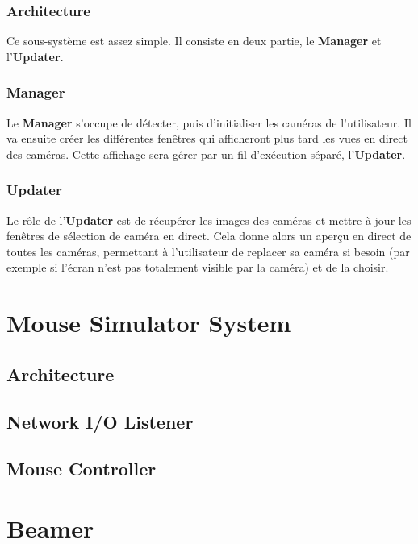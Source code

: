 \documentclass[11pt,a4paper,oldfontcommands]{memoir}
\begin{document}
\subsubsection{Architecture}

Ce sous-système est assez simple. Il consiste en deux partie, le \textbf{Manager} et l'\textbf{Updater}.

\subsubsection{Manager}

Le \textbf{Manager} s'occupe de détecter, puis d'initialiser les caméras de l'utilisateur. Il va ensuite créer les différentes fenêtres qui afficheront plus tard les vues en direct des caméras. Cette affichage sera gérer par un fil d'exécution séparé, l'\textbf{Updater}.

\subsubsection{Updater}

Le rôle de l'\textbf{Updater} est de récupérer les images des caméras et mettre à jour les fenêtres de sélection de caméra en direct. Cela donne alors un aperçu en direct de toutes les caméras, permettant à l'utilisateur de replacer sa caméra si besoin (par exemple si l'écran n'est pas totalement visible par la caméra) et de la choisir.

\newpage

\section{Mouse Simulator System}

\subsection{Architecture}

\subsection{Network I/O Listener}

\subsection{Mouse Controller}

\newpage

\section{Beamer}
\end{document}
